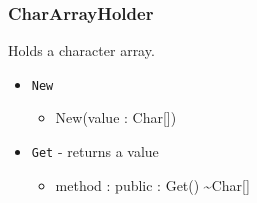 \documentclass[11pt]{article}
\begin{document}
\subsubsection{CharArrayHolder}
Holds a character array.
\begin{itemize}
\item \texttt{New}
  \begin{itemize}
  \item New(value : Char[])
  \end{itemize}
\item \texttt{Get} - returns a value
  \begin{itemize}
  \item method : public : Get() \textasciitilde Char[]
  \end{itemize}
\end{itemize}
\end{document}
